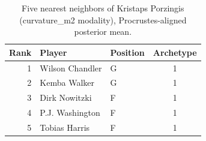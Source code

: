 \begin{table}[htbp]
  \centering\small
  \begin{tabular}{rllc}
    \toprule
    Rank & Player & Position & Archetype \\
    \midrule
    1 & Wilson Chandler & G & 1 \\
    2 & Kemba Walker & G & 1 \\
    3 & Dirk Nowitzki & F & 1 \\
    4 & P.J. Washington & F & 1 \\
    5 & Tobias Harris & F & 1 \\
    \bottomrule
  \end{tabular}
  \caption{Five nearest neighbors of Kristaps Porzingis (curvature_m2 modality), Procrustes-aligned posterior mean.}
  \label{tab:Kristaps_Porzingis_neighbors_curvature_m2}
\end{table}

